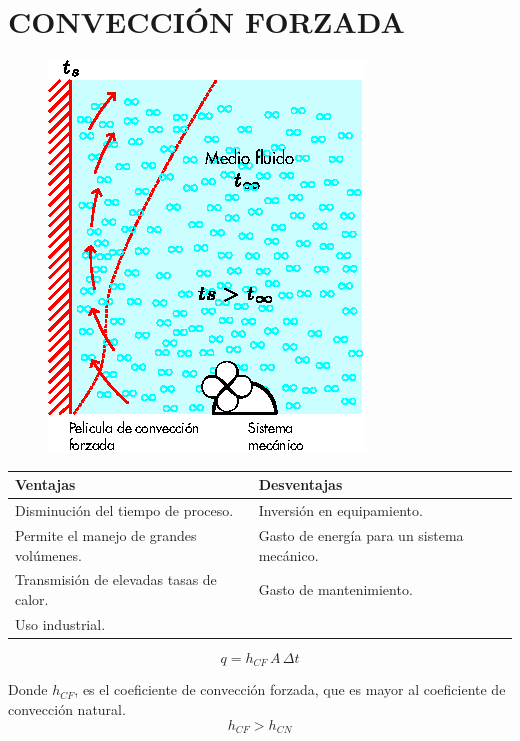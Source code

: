 \chapter{CONVECCIÓN FORZADA}

\begin{figure}[!h]
\centering
\includegraphics[scale=1.90]{figura05_01.eps}
\end{figure}

\begin{table}[!h]
\begin{center}
\begin{tabular}{|m{6.8cm}
                |m{6.8cm}|}
\hline
\textbf{Ventajas} &
\textbf{Desventajas} \tabularnewline \hline
Disminución del tiempo de proceso. &
Inversión en equipamiento. \tabularnewline \hline
Permite el manejo de grandes volúmenes. &
Gasto de energía para un sistema mecánico. \tabularnewline \hline
Transmisión de elevadas tasas de calor. &
Gasto de mantenimiento. \tabularnewline \hline
Uso industrial. & \tabularnewline \hline
\end{tabular}
\end{center}
\end{table}

\begin{equation*}
    q = h_{CF}\,A\,\Delta t
\end{equation*}

Donde $h_{CF}$, es el coeficiente de convección forzada, que es mayor al
coeficiente de convección natural.
\begin{equation*}
    h_{CF} > h_{CN}
\end{equation*}

